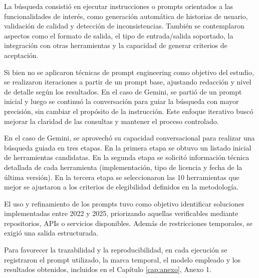 La búsqueda consistió en ejecutar instrucciones o prompts orientados a las funcionalidades de interés, como generación automática de historias de usuario, validación de calidad y detección de inconsistencias. También se contemplaron aspectos como el formato de salida, el tipo de entrada/salida soportado, la integración con otras herramientas y la capacidad de generar criterios de aceptación.

Si bien no se aplicaron técnicas de prompt engineering como objetivo del estudio, se realizaron iteraciones a partir de un prompt base, ajustando redacción y nivel de detalle según los resultados. En el caso de Gemini, se partió de un prompt inicial y luego se continuó la conversación para guiar la búsqueda con mayor precisión, sin cambiar el propósito de la instrucción. Este enfoque iterativo buscó mejorar la claridad de las consultas y mantener el proceso controlado.


En el caso de Gemini, se aprovechó su capacidad conversacional para realizar una búsqueda guiada en tres etapas. En la primera etapa se obtuvo un listado inicial de herramientas candidatas. En la segunda etapa se solicitó información técnica detallada de cada herramienta (implementación, tipo de licencia y fecha de la última versión). En la tercera etapa se seleccionaron las 10 herramientas que mejor se ajustaron a los criterios de elegibilidad definidos en la metodología.

El uso y refinamiento de los prompts tuvo como objetivo identificar soluciones implementadas entre 2022 y 2025, priorizando aquellas verificables mediante repositorios, APIs o servicios disponibles. Además de restricciones temporales, se exigió una salida estructurada.

Para favorecer la trazabilidad y la reproducibilidad, en cada ejecución se registraron el prompt utilizado, la marca temporal, el modelo empleado y los resultados obtenidos, incluidos en el Capítulo \ref{cap:anexo}, Anexo 1.


